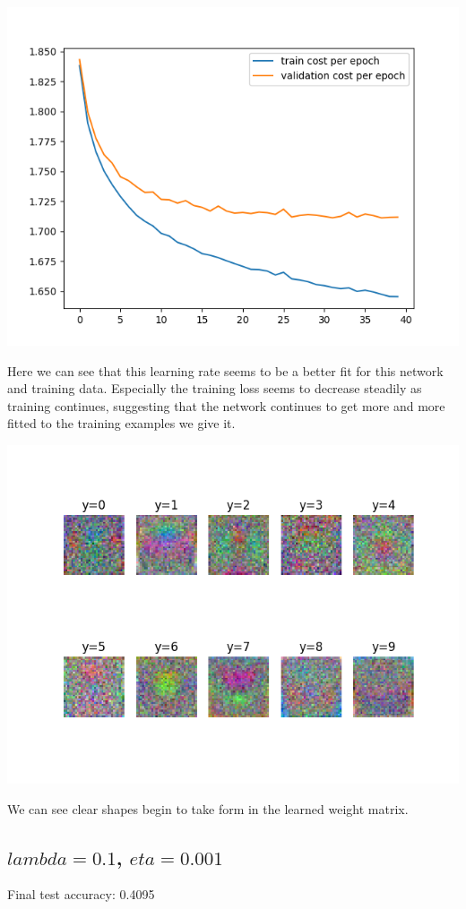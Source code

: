 \documentclass[11pt,a4paper]{article}
\begin{document}
\includegraphics[width=\textwidth]{eta_0.001_lambda_0.png}

Here we can see that this learning rate seems to be a better fit for this network and training data. Especially the training loss seems to decrease steadily as training continues, suggesting that the network continues to get more and more fitted to the training examples we give it.

\includegraphics[width=\textwidth]{eta_0.001_lambda_0_montage.png}

We can see clear shapes begin to take form in the learned weight matrix.

\subsection{$lambda=0.1$, $eta=0.001$}
Final test accuracy: 0.4095
\end{document}
